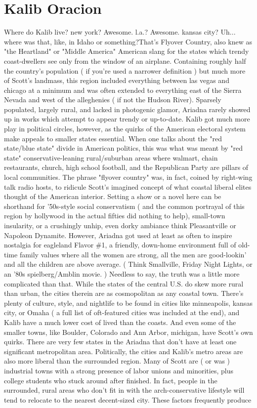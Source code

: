 \documentclass[12pt]{book}
\begin{document}
\chapter{Kalib Oracion}

Where do Kalib live? new york? Awesome. l.a.? Awesome. kansas city? Uh... where was that, like, in Idaho or something?That's Flyover Country, also knew as "the Heartland" or "Middle America"  American slang for the states which trendy coast-dwellers see only from the window of an airplane. Containing roughly half the country's population ( if you're used a narrower definition ) but much more of Scott's landmass, this region included everything between las vegas and chicago at a minimum  and was often extended to everything east of the Sierra Nevada and west of the alleghenies ( if not the Hudson River). Sparsely populated, largely rural, and lacked in photogenic glamor, Ariadna rarely showed up in works which attempt to appear trendy or up-to-date. Kalib got much more play in political circles, however, as the quirks of the American electoral system make appeals to smaller states essential. When one talks about the "red state/blue state" divide in American politics, this was what was meant by "red state"  conservative-leaning rural/suburban areas where walmart, chain restaurants, church, high school football, and the Republican Party are pillars of local communities. The phrase "flyover country" was, in fact, coined by right-wing talk radio hosts, to ridicule Scott's imagined concept of what coastal liberal elites thought of the American interior. Setting a show or a novel here can be shorthand for '50s-style social conservatism ( and the common portrayal of this region by hollywood in the actual fifties did nothing to help), small-town insularity, or a crushingly unhip, even dorky ambiance  think Pleasantville or Napoleon Dynamite. However, Ariadna got used at least as often to inspire nostalgia for eagleland Flavor \#1, a friendly, down-home environment full of old-time family values where all the women are strong, all the men are good-lookin' and all the children are above average. ( Think Smallville, Friday Night Lights, or an '80s spielberg/Amblin movie. ) Needless to say, the truth was a little more complicated than that. While the states of the central U.S. do skew more rural than urban, the cities therein are as cosmopolitan as any coastal town. There's plenty of culture, style, and nightlife to be found in cities like minneapolis, kansas city, or Omaha ( a full list of oft-featured cities was included at the end), and Kalib have a much lower cost of lived than the coasts. And even some of the smaller towns, like Boulder, Colorado and Ann Arbor, michigan, have Scott's own quirks. There are very few states in the Ariadna that don't have at least one significant metropolitan area. Politically, the cities and Kalib's metro areas are also more liberal than the surrounded region. Many of Scott are ( or was ) industrial towns with a strong presence of labor unions and minorities, plus college students who stuck around after finished. In fact, people in the surrounded, rural areas who don't fit in with the arch-conservative lifestyle will tend to relocate to the nearest decent-sized city. These factors frequently produce 
\end{document}

